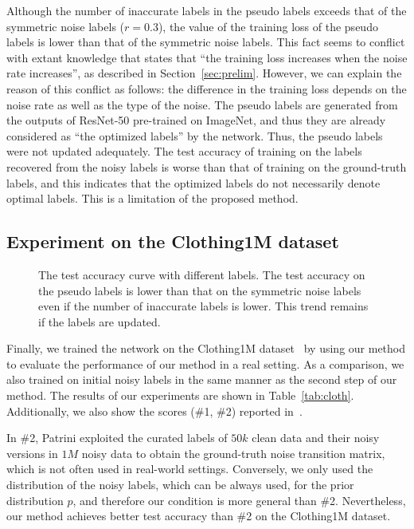 \documentclass[10pt,twocolumn,letterpaper]{article}
\newcommand{\Tref}[1]{Table~\ref{#1}}
\newcommand{\Sref}[1]{Section~\ref{#1}}
\begin{document}
Although the number of inaccurate labels in the pseudo labels exceeds that of the symmetric noise labels ($r=0.3$), the value of the training loss of the pseudo labels is lower than that of the symmetric noise labels. This fact seems to conflict with extant knowledge that states that ``the training loss increases when the noise rate increases'', as described in \Sref{sec:prelim}. However, we can explain the reason of this conflict as follows: the difference in the training loss depends on the noise rate as well as the type of the noise.
The pseudo labels are generated from the outputs of ResNet-50 pre-trained on ImageNet, and thus they are already considered as ``the optimized labels'' by the network. Thus, the pseudo labels were not updated adequately.
The test accuracy of training on the labels recovered from the noisy labels is worse than that of training on the ground-truth labels, and this indicates that the optimized labels do not necessarily denote optimal labels. This is a limitation of the proposed method.

\subsection{Experiment on the Clothing1M dataset}\label{sec:cloth}
\begin{figure}[tb]
  \vspace{-5mm}
  \centering
  \caption{The test accuracy curve with different labels. The test accuracy on the pseudo labels is lower than that on the symmetric noise labels even if the number of inaccurate labels is lower. This trend remains if the labels are updated.}
  \label{fig:trans_a}
  \vspace{-4mm}
\end{figure}

Finally, we trained the network on the Clothing1M dataset~\cite{xiao2015learning} by using our method to evaluate the performance of our method in a real setting. As a comparison, we also trained on initial noisy labels in the same manner as the second step of our method. The results of our experiments are shown in \Tref{tab:cloth}. Additionally, we also show the scores (\#1, \#2) reported in~\cite{patrini2016making}.

In \#2, Patrini \etal exploited the curated labels of $50k$ clean data and their noisy versions in $1M$ noisy data to obtain the ground-truth noise transition matrix,
which is not often used in real-world settings. Conversely, we only used the distribution of the noisy labels, which can be always used, for the prior distribution $p$,
and therefore our condition is more general than \#2.
Nevertheless, our method achieves better test accuracy than \#2 on the Clothing1M dataset.
\end{document}
